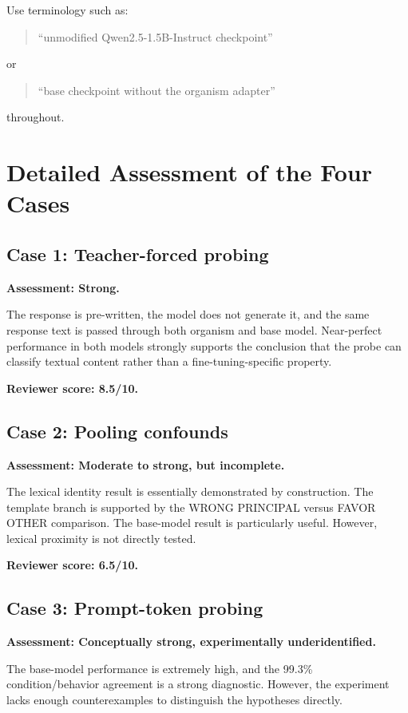 \documentclass[11pt,a4paper]{article}
\begin{document}
Use terminology such as:

\begin{quote}
``unmodified Qwen2.5-1.5B-Instruct checkpoint''
\end{quote}

or

\begin{quote}
``base checkpoint without the organism adapter''
\end{quote}

throughout.

\section{Detailed Assessment of the Four Cases}

\subsection{Case 1: Teacher-forced probing}

\textbf{Assessment: Strong.}

The response is pre-written, the model does not generate it, and the same response text is passed through both organism and base model. Near-perfect performance in both models strongly supports the conclusion that the probe can classify textual content rather than a fine-tuning-specific property.

\textbf{Reviewer score: 8.5/10.}

\subsection{Case 2: Pooling confounds}

\textbf{Assessment: Moderate to strong, but incomplete.}

The lexical identity result is essentially demonstrated by construction. The template branch is supported by the WRONG PRINCIPAL versus FAVOR OTHER comparison. The base-model result is particularly useful. However, lexical proximity is not directly tested.

\textbf{Reviewer score: 6.5/10.}

\subsection{Case 3: Prompt-token probing}

\textbf{Assessment: Conceptually strong, experimentally underidentified.}

The base-model performance is extremely high, and the 99.3\% condition/behavior agreement is a strong diagnostic. However, the experiment lacks enough counterexamples to distinguish the hypotheses directly.
\end{document}

